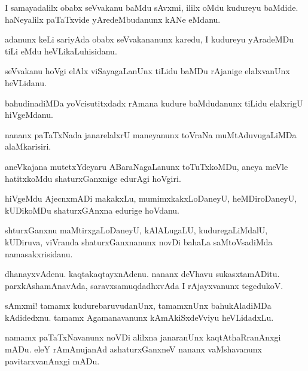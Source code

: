 \documentclass{article}
\begin{document}
\begin{mn}%
I samayadalilx obabx seVvakanu baMdu sAvxmi, ililx oMdu kudureyu baMdide. haNeyalilx 
paTaTxvide yAredeMbudanunx kANe eMdanu.
\end{mn}

\begin{mn}%
adanunx keLi sariyAda obabx seVvakananunx karedu, I kudureyu yAradeMDu tiLi eMdu 
heVLikaLuhisidanu.
\end{mn}

\begin{mn}%
seVvakanu hoVgi elAlx viSayagaLanUnx tiLidu baMDu rAjanige elalxvanUnx heVLidanu.
\end{mn}

\begin{mn}%
bahudinadiMDa yoVcisutitxdadx rAmana kudure baMdudanunx tiLidu elalxrigU hiVgeMdanu.
\end{mn}

\begin{mn}%
nananx paTaTxNada janarelalxrU maneyanunx toVraNa muMtAduvugaLiMDa alaMkarisiri.
\end{mn}

\begin{mn}%
aneVkajana mutetxYdeyaru ABaraNagaLanunx toTuTxkoMDu, aneya meVle hatitxkoMdu 
shaturxGanxnige edurAgi hoVgiri.
\end{mn}

\begin{mn}%
hiVgeMdu AjecnxmADi makakxLu, mumimxkakxLoDaneyU, heMDiroDaneyU, kUDikoMDu shaturxGAnxna 
edurige hoVdanu.
\end{mn}

\begin{mn}%
shturxGanxnu maMtirxgaLoDaneyU, kAlALugaLU, kuduregaLiMdalU, kUDiruva, viVranda 
shaturxGanxnanunx novDi bahaLa saMtoVsadiMda namasakxrisidanu.
\end{mn}

\begin{mn}%
dhanayxvAdenu. kaqtakaqtayxnAdenu. nananx deVhavu sukasxtamADitu. parxkAshamAnavAda, 
saravxsamuqdadhxvAda I rAjayxvanunx tegedukoV.
\end{mn}

\begin{mn}%
sAmxmi! tamamx kudurebaruvudanUnx, tamamxnUnx bahukAladiMDa kAdidedxnu. tamamx 
Agamanavanunx kAmAkiSxdeVviyu heVLidadxLu.
\end{mn}

\begin{mn}%
namamx paTaTxNavanunx noVDi alilxna janaranUnx kaqtAthaRranAnxgi mADu. eleY rAmAnujanAd 
ashaturxGanxneV nananx vaMshavanunx pavitarxvanAnxgi mADu.
\end{mn}
\end{document}
